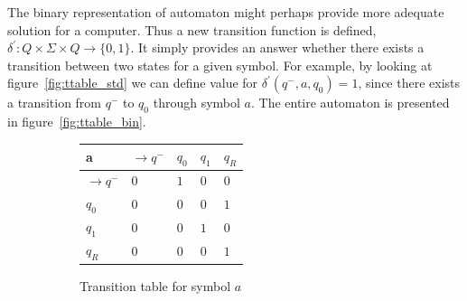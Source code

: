 \documentclass{mini}
\begin{document}
The binary representation of automaton might perhaps provide more adequate solution for a computer. Thus a new transition function is defined, $\delta^{'}: Q \times \Sigma \times Q \rightarrow \{0,1\}$. It simply provides an answer whether there exists a transition between two states for a given symbol. For example, by looking at figure~\ref{fig:ttable_std} we can define value for $\delta^{'}(q^-,a,q_0) = 1$, since there exists a transition from $q^-$ to $q_0$ through symbol $a$. The entire automaton is presented in figure~\ref{fig:ttable_bin}.


%
%
\begin{figure}[H]
    \begin{center}
        
        \setlength{\tabcolsep}{4pt}
        \renewcommand{\arraystretch}{1.4}
        
        \begin{subfigure}{.5\textwidth}
            
            \centering
            \begin{tabular}{|P{1.0cm} || P{0.8cm} | P{0.8cm} | P{0.8cm} | P{0.8cm}|}
                
                \hline
                a & $\rightarrow$$q^-$ & $q_0$ & $q_1$ & $q_R$ \\
                \hline
                \hline
                $\rightarrow$$q^-$ 		& $0$ & $1$ & $0$ & $0$ \\
                \hline
                $q_0$ 		& $0$ & $0$ & $0$ & $1$ \\
                \hline
                $q_1$ 		& $0$ & $0$ & $1$ & $0$ \\
                \hline
                $q_R$  					& $0$ & $0$ & $0$ & $1$ \\
                \hline
                
            \end{tabular}
            
            \caption{Transition table for symbol $a$}
            \label{fig:ttable_bin_a}	
            
        \end{subfigure}%
        \begin{subfigure}{.5\textwidth}
            
            \centering
            \begin{tabular}{|P{1.0cm} || P{0.8cm} | P{0.8cm} | P{0.8cm} | P{0.8cm}|}
                

\end{tabular}
\end{subfigure}
\end{center}
\end{figure}
\end{document}
